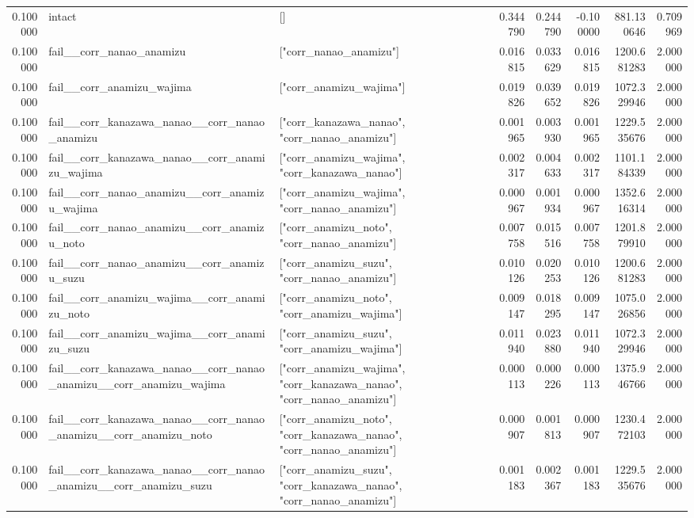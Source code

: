 \begin{tabular}{rllrrrrr}
0.100000 & intact & [] & 0.344790 & 0.244790 & -0.100000 & 881.130646 & 0.709969 \\
0.100000 & fail\_\_corr\_nanao\_anamizu & ["corr\_nanao\_anamizu"] & 0.016815 & 0.033629 & 0.016815 & 1200.681283 & 2.000000 \\
0.100000 & fail\_\_corr\_anamizu\_wajima & ["corr\_anamizu\_wajima"] & 0.019826 & 0.039652 & 0.019826 & 1072.329946 & 2.000000 \\
0.100000 & fail\_\_corr\_kanazawa\_nanao\_\_corr\_nanao\_anamizu & ["corr\_kanazawa\_nanao", "corr\_nanao\_anamizu"] & 0.001965 & 0.003930 & 0.001965 & 1229.535676 & 2.000000 \\
0.100000 & fail\_\_corr\_kanazawa\_nanao\_\_corr\_anamizu\_wajima & ["corr\_anamizu\_wajima", "corr\_kanazawa\_nanao"] & 0.002317 & 0.004633 & 0.002317 & 1101.184339 & 2.000000 \\
0.100000 & fail\_\_corr\_nanao\_anamizu\_\_corr\_anamizu\_wajima & ["corr\_anamizu\_wajima", "corr\_nanao\_anamizu"] & 0.000967 & 0.001934 & 0.000967 & 1352.616314 & 2.000000 \\
0.100000 & fail\_\_corr\_nanao\_anamizu\_\_corr\_anamizu\_noto & ["corr\_anamizu\_noto", "corr\_nanao\_anamizu"] & 0.007758 & 0.015516 & 0.007758 & 1201.879910 & 2.000000 \\
0.100000 & fail\_\_corr\_nanao\_anamizu\_\_corr\_anamizu\_suzu & ["corr\_anamizu\_suzu", "corr\_nanao\_anamizu"] & 0.010126 & 0.020253 & 0.010126 & 1200.681283 & 2.000000 \\
0.100000 & fail\_\_corr\_anamizu\_wajima\_\_corr\_anamizu\_noto & ["corr\_anamizu\_noto", "corr\_anamizu\_wajima"] & 0.009147 & 0.018295 & 0.009147 & 1075.026856 & 2.000000 \\
0.100000 & fail\_\_corr\_anamizu\_wajima\_\_corr\_anamizu\_suzu & ["corr\_anamizu\_suzu", "corr\_anamizu\_wajima"] & 0.011940 & 0.023880 & 0.011940 & 1072.329946 & 2.000000 \\
0.100000 & fail\_\_corr\_kanazawa\_nanao\_\_corr\_nanao\_anamizu\_\_corr\_anamizu\_wajima & ["corr\_anamizu\_wajima", "corr\_kanazawa\_nanao", "corr\_nanao\_anamizu"] & 0.000113 & 0.000226 & 0.000113 & 1375.946766 & 2.000000 \\
0.100000 & fail\_\_corr\_kanazawa\_nanao\_\_corr\_nanao\_anamizu\_\_corr\_anamizu\_noto & ["corr\_anamizu\_noto", "corr\_kanazawa\_nanao", "corr\_nanao\_anamizu"] & 0.000907 & 0.001813 & 0.000907 & 1230.472103 & 2.000000 \\
0.100000 & fail\_\_corr\_kanazawa\_nanao\_\_corr\_nanao\_anamizu\_\_corr\_anamizu\_suzu & ["corr\_anamizu\_suzu", "corr\_kanazawa\_nanao", "corr\_nanao\_anamizu"] & 0.001183 & 0.002367 & 0.001183 & 1229.535676 & 2.000000 \\

\end{tabular}
